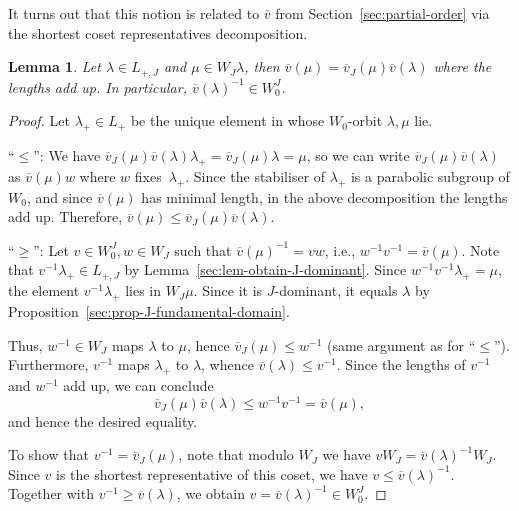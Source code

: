 \documentclass[10pt,a4paper]{amsart}
\newtheorem{Lemma}[Theorem]{Lemma}
\theoremstyle{definition}
\numberwithin{equation}{section}
\begin{document}
It turns out that this notion is related to $\overline{v}$ from Section~\ref{sec:partial-order}
via the shortest coset representatives decomposition.

\begin{Lemma}\label{sec:lem-decompose-vs}
 Let $\lambda\in L_{+,J}$ and $\mu\in W_J\lambda$, then
$
 \overline{v}(\mu) = \overline{v}_J(\mu)\overline{v}(\lambda)
$
 where the lengths add up. In particular, $\overline{v}(\lambda)^{-1}\in W_0^J$.
\end{Lemma}
\begin{proof}
 Let $\lambda_+\in L_+$ be the unique element in whose $W_0$-orbit $\lambda,\mu$ lie.

``$\le$'': We have
$
 \overline{v}_J(\mu)\overline{v}(\lambda)\lambda_+
 =\overline{v}_J(\mu)\lambda = \mu$,
 so we can write $\overline{v}_J(\mu)\overline{v}(\lambda)$ as $\overline{v}(\mu)w$ where $w$ fixes~$\lambda_+$. Since
 the stabiliser of $\lambda_+$ is a parabolic subgroup of $W_0$, and since $\overline{v}(\mu)$ has minimal length, in the above
 decomposition the lengths add up. Therefore, $\overline{v}(\mu)\le \overline{v}_J(\mu)\overline{v}(\lambda)$.

``$\ge$'':
 Let $v\in W_0^J, w\in W_J$ such that $\overline{v}(\mu)^{-1}=vw$,
 i.e., $w^{-1}v^{-1} = \overline{v}(\mu)$. Note that
 $v^{-1}\lambda_+\in L_{+,J}$ by Lemma~\ref{sec:lem-obtain-J-dominant}.
 Since $w^{-1}v^{-1}\lambda_+=\mu$, the element $v^{-1}\lambda_+$ lies in $W_J\mu$. Since it is $J$-dominant,
 it equals $\lambda$ by Proposition~\ref{sec:prop-J-fundamental-domain}.

 Thus, $w^{-1}\in W_J$ maps $\lambda$ to $\mu$, hence
 $\overline{v}_J(\mu)\le w^{-1}$ (same argument as for ``$\le$'').
 Furthermore, $v^{-1}$ maps $\lambda_+$ to $\lambda$, whence $\overline{v}(\lambda)\le v^{-1}$.
 Since the lengths of $v^{-1}$ and
 $w^{-1}$ add up, we can conclude
 \[
 \overline{v}_J(\mu)\overline{v}(\lambda)
 \le w^{-1}v^{-1}=\overline{v}(\mu),
 \]
 and hence the desired equality.

 To show that $v^{-1}=\overline{v}_J(\mu)$, note that modulo $W_J$ we have
$
 vW_J = \overline{v}(\lambda)^{-1}W_J$.
 Since $v$ is the shortest representative of this coset, we have $v\le \overline{v}(\lambda)^{-1}$.
 Together with $v^{-1}\ge \overline{v}(\lambda)$, we obtain $v=\overline{v}(\lambda)^{-1}\in W_0^J$.
\end{proof}
\end{document}
